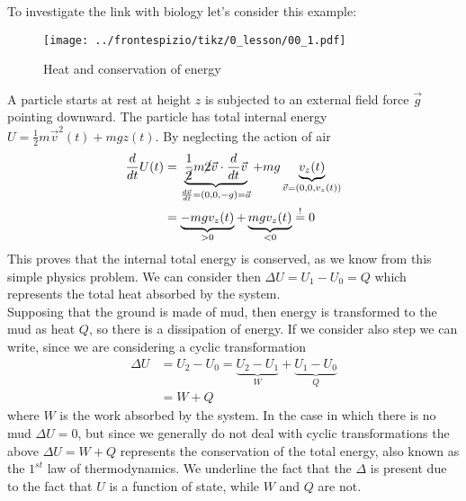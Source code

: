 \documentclass[../main/main.tex]{subfiles}
\begin{document}
To investigate the link with biology let's consider this example:
\begin{figure}[ht!]
    \centering
    \texttt{[image: ../frontespizio/tikz/0\_lesson/00\_1.pdf]}
    \caption{Heat and conservation of energy}
\end{figure}
A particle starts at rest at height $z$ is subjected to an external field force $\vec{g}$ pointing downward. The particle has total internal energy $U = \frac{1}{2}m\vec{v}^2(t)+mgz(t)$. By neglecting the action of air
\begin{equation*}
    \begin{split}
        \frac{d}{dt}U(t) & =\underbrace{\frac{1}{\cancel{2}}m\cancel{2}\vec{v}\cdot\frac{d}{dt}\vec{v}}_{\frac{d\vec{v}}{dt}=(0,0,-g)=\vec{a}}+mg\underbrace{v_z(t)}_{\vec{v}=(0,0,v_z(t))}\\
        & = \underbrace{-mgv_z(t)}_{>0}+\underbrace{mgv_z(t)}_{<0}\stackrel{!}{=} 0
    \end{split}
\end{equation*}
This proves that the internal total energy is conserved, as we know from this simple physics problem.
We can consider then $\Delta U = U_1-U_0 = Q$ which represents the total heat absorbed by the system.\\
Supposing that the ground is made of mud, then energy is transformed to the mud as heat $Q$, so there is a dissipation of energy. If we consider also step  we can write, since we are considering a cyclic transformation
\begin{equation}
    \begin{split}
        \Delta U &= U_2-U_0 = \underbrace{U_2-U_1}_{W}+\underbrace{U_1-U_0}_{Q}\\
        &=W+Q
    \end{split}
\end{equation}
where $W$ is the work absorbed by the system. In the case in which there is no mud $\Delta U = 0$, but since we generally do not deal with cyclic transformations the above $\Delta U = W+Q$ represents the conservation of the total energy, also known as the $1^{st}$ law of thermodynamics. We underline the fact that the $\Delta$ is present due to the fact that $U$ is a function of state, while $W$ and $Q$ are not. 
\end{document}

